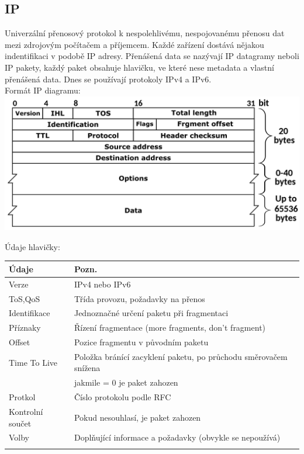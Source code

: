 \subsection{IP}
\begin{multicols}{2}
  Univerzální přenosový protokol k nespolehlivému, nespojovanému přenosu dat mezi zdrojovým počítačem a příjemcem.
  Každé zařízení dostává nějakou indentifikaci v podobě IP adresy.
  Přenášená data se nazývají IP datagramy neboli IP pakety, každý paket obsahuje hlavičku, ve které nese metadata a vlastní přenášená data.
  Dnes se používají protokoly IPv4 a IPv6. \\

  \columnbreak
  Formát IP diagramu: \\
  \includegraphics[width=\linewidth]{TVY-POS/ISO-OSI-TCP-IP/IPv4.png} \\
\end{multicols}
Údaje hlavičky: \\
\begin{tabularx}{\linewidth}{l|l}
  \textbf{Údaje}   & \textbf{Pozn.}                                                   \\
  \hline
  Verze            & IPv4 nebo IPv6                                                   \\
  \hline
  ToS,QoS          & Třída provozu, požadavky na přenos                               \\
  \hline
  Identifikace     & Jednoznačné určení paketu při fragmentaci                        \\
  \hline
  Příznaky         & Řízení fragmentace (more fragments, don't fragment)              \\
  \hline
  Offset           & Pozice fragmentu v původním paketu                               \\
  \hline
  Time To Live     & Položka bránící zacyklení paketu, po průchodu směrovačem snížena \\
                   & jakmile = 0 je paket zahozen                                     \\
  \hline
  Protkol          & Číslo protokolu podle RFC                                        \\
  \hline
  Kontrolní součet & Pokud nesouhlasí, je paket zahozen                               \\
  \hline
  Volby            & Doplňující informace a požadavky (obvykle se nepoužívá)          \\
  \multicolumn{2}{l}{}                                                                \\
\end{tabularx}
